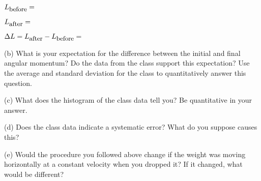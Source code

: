 \( L_{\mbox{\small before}}= \)  
\vspace{5mm}

\( L_{\mbox{\small after}}= \)
\vspace{5mm}

\( \Delta L= L_{\mbox{\small after}} - L_{\mbox{\small before}} = \)  
\vspace{15mm}

(b) What is your expectation for the difference between the initial and final angular momentum?
Do the data from the class support this expectation? 
Use the average and standard deviation for the class to quantitatively answer this question.
\vspace{25mm}

(c) What does the histogram of the class data tell you? Be quantitative in your answer.
\vspace{25mm}

(d) Does the class data indicate a systematic error?  What do you suppose causes this?
\vspace{25mm}

(e) Would the procedure you followed above change if the weight was moving horizontally at a constant velocity when you dropped it? 
If it changed, what would be different?
\vspace{20mm}

